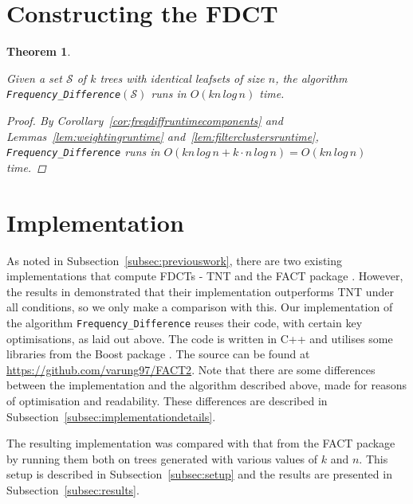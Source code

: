 \documentclass{article}
\newtheorem{freqdiffruntime}[incompatibility]{Theorem}
\begin{document}
    \section{Constructing the FDCT}
    \label{sec:freqdiffconstruction}

    \begin{freqdiffruntime}
        \label{theorem:freqdiffruntime}

        Given a set $\mathcal{S}$ of $k$ trees with identical leafsets of size $n$, the algorithm \texttt{Frequency\_Difference}$(\mathcal{S})$ runs in $O(kn\,log\,n)$ time.

        \begin{proof}
            By Corollary~\ref{cor:freqdiffruntimecomponents} and Lemmas~\ref{lem:weightingruntime} and~\ref{lem:filterclustersruntime}, \texttt{Frequency\_Difference} runs in $O(kn\,log\,n + k \cdot n\,log\,n) = O(kn\,log\,n)$ time.
        \end{proof}
    \end{freqdiffruntime}

    \section{Implementation}
    \label{sec:implementation}

    As noted in Subsection~\ref{subsec:previouswork}, there are two existing implementations that compute FDCTs - TNT \cite{goloboff2008tnt} and the FACT package \cite{jansson2016improved}. However, the results in \cite{jansson2018algorithms} demonstrated that their implementation outperforms TNT under all conditions, so we only make a comparison with this. Our implementation of the algorithm \texttt{Frequency\_Difference} reuses their code, with certain key optimisations, as laid out above. The code is written in C++ and utilises some libraries from the Boost package \cite{BoostLibrary}. The source can be found at \url{https://github.com/varung97/FACT2}. Note that there are some differences between the implementation and the algorithm described above, made for reasons of optimisation and readability. These differences are described in Subsection~\ref{subsec:implementationdetails}.

    The resulting implementation was compared with that from the FACT package by running them both on trees generated with various values of $k$ and $n$. This setup is described in Subsection~\ref{subsec:setup} and the results are presented in Subsection~\ref{subsec:results}.
\end{document}
